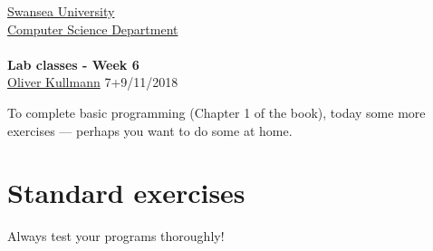 \documentclass[11pt]{article}
\newcommand{\Java}{\lstset{language=Java,keywordstyle=\bfseries,breaklines,breakindent=30pt}}
\begin{document}
\begin{center}
  \href{http://www.swan.ac.uk/}{Swansea University}\\
  \href{http://www.swan.ac.uk/compsci/}{Computer Science Department}\\[1ex]
  \href{\chp}{\module}\\[1ex]
  \textbf{Lab classes - Week 6}\\
  \href{http://cs.swan.ac.uk/~csoliver}{Oliver Kullmann} 7+9/11/2018
\end{center}


To complete basic programming (Chapter 1 of the book), today some more exercises --- perhaps you want to do some at home.


\section{Standard exercises}
\label{sec:stdex}

\Java

Always test your programs thoroughly!
\end{document}
